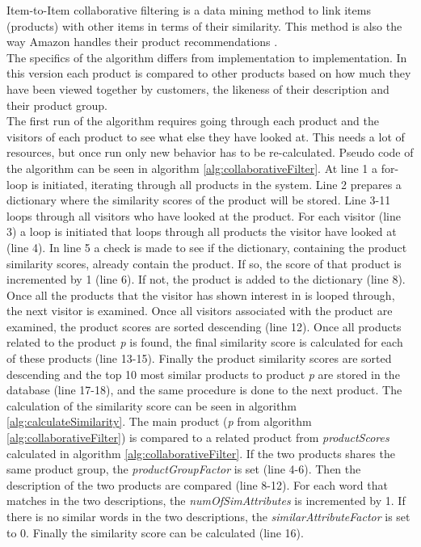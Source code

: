 Item-to-Item collaborative filtering is a data mining method to link items (products) with other items in terms of their similarity. This method is also the way \gls{Amazon} handles their product recommendations \cite{AmazonRecommendations}. \\
The specifics of the algorithm differs from implementation to implementation. In this version each product is compared to other products based on how much they have been viewed together by customers, the likeness of their description and their product group. \\
The first run of the algorithm requires going through each product and the visitors of each product to see what else they have looked at. This needs a lot of resources, but once run only new behavior has to be re-calculated. Pseudo code of the algorithm can be seen in algorithm \ref{alg:collaborativeFilter}. At line 1 a for-loop is initiated, iterating through all products in the system. Line 2 prepares a dictionary where the similarity scores of the product will be stored. Line 3-11 loops through all visitors who have looked at the product. For each visitor (line 3) a loop is initiated that loops through all products the visitor have looked at (line 4). In line 5 a check is made to see if the dictionary, containing the product similarity scores, already contain the product. If so, the score of that product is incremented by 1 (line 6). If not, the product is added to the dictionary (line 8). Once all the products that the visitor has shown interest in is looped through, the next visitor is examined. Once all visitors associated with the product are examined, the product scores are sorted descending (line 12). Once all products related to the product \textit{p} is found, the final similarity score is calculated for each of these products (line 13-15). Finally the product similarity scores are sorted descending and the top 10 most similar products to product \textit{p} are stored in the database (line 17-18), and the same procedure is done to the next product. The calculation of the similarity score can be seen in algorithm \ref{alg:calculateSimilarity}. The main product (\textit{p} from algorithm \ref{alg:collaborativeFilter}) is compared to a related product from \textit{productScores} calculated in algorithm \ref{alg:collaborativeFilter}. If the two products shares the same product group, the \textit{productGroupFactor} is set (line 4-6). Then the description of the two products are compared (line 8-12). For each word that matches in the two descriptions, the \textit{numOfSimAttributes} is incremented by 1. If there is no similar words in the two descriptions, the \textit{similarAttributeFactor} is set to 0. Finally the similarity score can be calculated (line 16).\\\\

